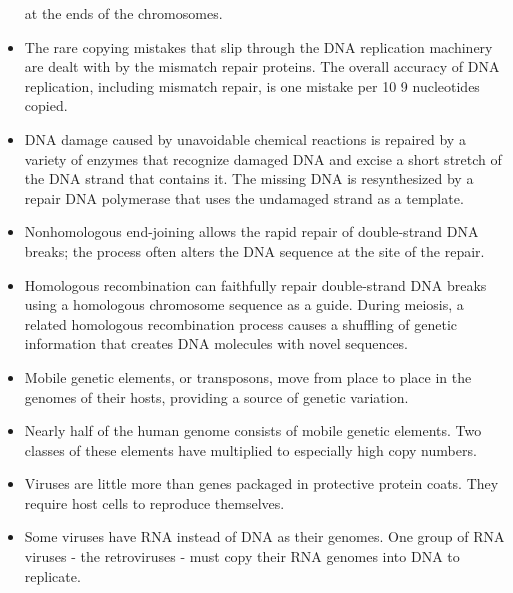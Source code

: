 \begin{itemize}
at the ends of the chromosomes.
\item The rare copying mistakes that slip through the DNA replication
machinery are dealt with by the mismatch repair proteins. The overall
accuracy of DNA replication, including mismatch repair, is one
mistake per 10 9 nucleotides copied.
\item DNA damage caused by unavoidable chemical reactions is repaired
by a variety of enzymes that recognize damaged DNA and excise a
short stretch of the DNA strand that contains it. The missing DNA is
resynthesized by a repair DNA polymerase that uses the undamaged
strand as a template.
\item Nonhomologous end-joining allows the rapid repair of double-strand
DNA breaks; the process often alters the DNA sequence at the site of
the repair.
\item Homologous recombination can faithfully repair double-strand DNA
breaks using a homologous chromosome sequence as a guide. During
meiosis, a related homologous recombination process causes a shuffling
of genetic information that creates DNA molecules with novel
sequences.
\item Mobile genetic elements, or transposons, move from place to place in
the genomes of their hosts, providing a source of genetic variation.
\item Nearly half of the human genome consists of mobile genetic elements.
Two classes of these elements have multiplied to especially
high copy numbers.
\item Viruses are little more than genes packaged in protective protein
coats. They require host cells to reproduce themselves.
\item Some viruses have RNA instead of DNA as their genomes. One group
of RNA viruses - the retroviruses - must copy their RNA genomes into
DNA to replicate.
\end{itemize}
